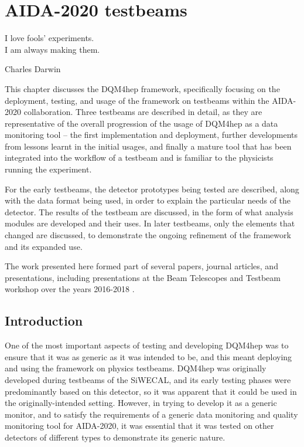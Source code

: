 \chapter{\acrshort{AIDA}-2020 testbeams}
\label{chapter:aidatestbeams}

\epigraph{I love fools' experiments. \\I am always making them.}{Charles Darwin}

This chapter discusses the \acrshort{DQM4hep} framework, specifically focusing on the deployment, testing, and usage of the framework on testbeams within the \acrshort{AIDA}-2020 collaboration. Three testbeams are described in detail, as they are representative of the overall progression of the usage of \acrshort{DQM4hep} as a data monitoring tool -- the first implementation and deployment, further developments from lessons learnt in the initial usages, and finally a mature tool that has been integrated into the workflow of a testbeam and is familiar to the physicists running the experiment.

For the early testbeams, the detector prototypes being tested are described, along with the data format being used, in order to explain the particular needs of the detector. The results of the testbeam are discussed, in the form of what analysis modules are developed and their uses. In later testbeams, only the elements that changed are discussed, to demonstrate the ongoing refinement of the framework and its expanded use.

The work presented here formed part of several papers, journal articles, and presentations, including presentations at the Beam Telescopes and Testbeam workshop over the years 2016-2018 \cite{dqm4hep-twepp} \cite{dqm4hep-ieee}.

\section{Introduction}
One of the most important aspects of testing and developing \acrshort{DQM4hep} was to ensure that it was as generic as it was intended to be, and this meant deploying and using the framework on physics testbeams. \acrshort{DQM4hep} was originally developed during testbeams of the \acrfull{SiWECAL}, and its early testing phases were predominantly based on this detector, so it was apparent that it could be used in the originally-intended setting. However, in trying to develop it as a generic monitor, and to satisfy the requirements of a generic data monitoring and quality monitoring tool for \acrshort{AIDA}-2020, it was essential that it was tested on other detectors of different types to demonstrate its generic nature. 

